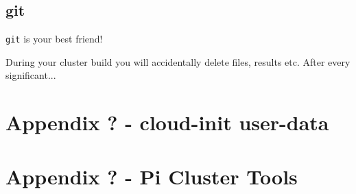 \documentclass{article}
\begin{document}
\subsection{git}
\verb|git| is your best friend!

During your cluster build you will accidentally delete files, results etc. After every significant...


%
%
\clearpage\section{Appendix ? - cloud-init user-data}




%
%
\clearpage\section{Appendix ? - Pi Cluster Tools}









%


%
%
\end{document}
